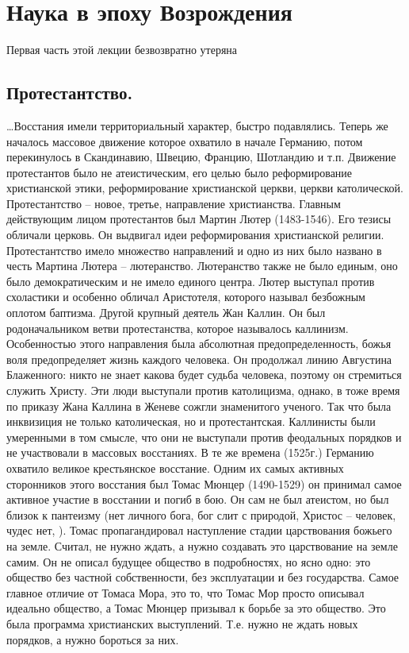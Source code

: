 \section{Наука в эпоху Возрождения}

Первая часть этой лекции безвозвратно утеряна
\subsection{Протестантство.}

…Восстания имели территориальный характер, быстро подавлялись. Теперь же началось массовое движение которое охватило в начале Германию, потом перекинулось в Скандинавию, Швецию, Францию, Шотландию и т.п. Движение протестантов было не атеистическим, его целью было реформирование христианской этики, реформирование христианской церкви, церкви католической. Протестантство – новое, третье, направление христианства. Главным действующим лицом протестантов был Мартин Лютер (1483-1546). Его тезисы обличали церковь. Он выдвигал идеи реформирования христианской религии. Протестантство имело множество направлений и одно из них было названо в честь Мартина Лютера – лютеранство. Лютеранство также не было единым, оно было демократическим и не имело единого центра. Лютер выступал против схоластики и особенно обличал Аристотеля, которого называл безбожным оплотом баптизма. Другой крупный деятель Жан Каллин. Он был родоначальником ветви протестанства, которое называлось каллинизм. Особенностью этого направления была абсолютная предопределенность, божья воля предопределяет жизнь каждого человека. Он продолжал линию Августина Блаженного: никто не знает какова будет судьба человека, поэтому он стремиться служить Христу. Эти люди выступали против католицизма, однако, в тоже время по приказу Жана Каллина в Женеве сожгли знаменитого ученого. Так что была инквизиция не только католическая, но и протестантская. Каллинисты были умеренными в том смысле, что они не выступали против феодальных порядков и не участвовали в массовых восстаниях. В те же времена (1525г.) Германию охватило великое крестьянское восстание. Одним их самых активных сторонников этого восстания был Томас Мюнцер (1490-1529) он принимал самое активное участие в восстании и погиб в бою. Он сам не был атеистом, но был близок к пантеизму (нет личного бога, бог слит с природой, Христос – человек, чудес нет, ). Томас пропагандировал наступление стадии царствования божьего на земле. Считал, не нужно ждать, а нужно создавать это царствование на земле самим. Он не описал будущее общество в подробностях, но ясно одно: это общество без частной собственности, без эксплуатации и без государства. Самое главное отличие от Томаса Мора, это то, что Томас Мор просто описывал идеально общество, а Томас Мюнцер призывал к борьбе за это общество. Это была программа христианских выступлений. Т.е. нужно не ждать новых порядков, а нужно бороться за них.
